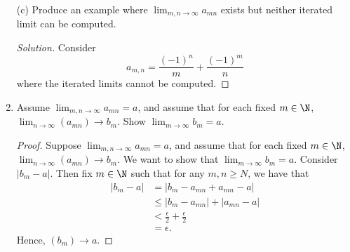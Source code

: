 \begin{enumerate}
\begin{proof}
            We can try to do the same process for the sequence \( a_{mn} = mn / (m^2 + n^2 )\). Hence, we have 
            \[ \lim_{n \to \infty} \Big( \lim_{m \to \infty} \frac{mn}{m^2 + n^2 } \Big) = \lim_{n \to \infty} (0) = 0 \tag{3} \]
            and 
            \[ \lim_{m \to \infty} \Big( \lim_{ n \to \infty} \frac{mn}{m^2 + n^2 } \Big) = \lim_{m \to \infty} (0)  = 0 \tag{4}\]
            Since (2) and (3) are equal, we have that \( \lim_{m,n \to  \infty} a_{mn}\) exists.  
        \end{proof}
    \item[(c)] Produce an example where \( \lim_{m,n \to \infty} a_{mn}\) exists but neither iterated limit can be computed. 
        \begin{proof}[Solution]
        Consider 
        \[ a_{m,n} = \frac{(-1)^n}{m} + \frac{(-1)^m}{n}\]
        where the iterated limits cannot be computed.
        \end{proof}
    \item Assume \( \lim_{m,n \to \infty} a_{mn} = a \), and assume that for each fixed \( m \in \N \), \( \lim_{n \to \infty} (a_{mn}) \to b_m \). Show \( \lim_{m \to \infty} b_m = a .\)
        \begin{proof}
            Suppose \( \lim_{m,n \to \infty} a_{mn} = a \), and assume that for each fixed \( m \in \N \), \( \lim_{n \to \infty } (a_{mn}) \to b_m \). We want to show that \( \lim_{m \to \infty } b_m = a \). Consider \( | b_m - a | \). Then fix \( m \in \N \) such that for any \( m,n \geq N \), we have that  
            \begin{align*}
                |b_m - a |&= |b_m - a_{mn} + a_{mn} - a | \\
                          &\leq |b_m - a_{mn}| + |a_{mn} - a | \\
                          &< \frac{\epsilon}{2} + \frac{\epsilon}{2} \\
                          &= \epsilon.
            \end{align*}
        Hence, \( (b_{m}) \to a \). 
        \end{proof}
\end{enumerate}
 







